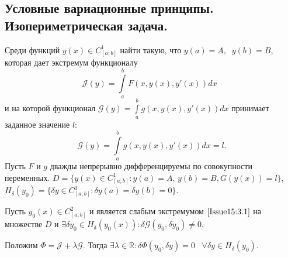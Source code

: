 \subsection{Условные вариационные принципы. Изопериметрическая задача.}
Среди функций $y(x)\in C^1_{[a;b]}$ найти такую, что $y(a)=A,\;\; y(b)=B$, которая дает экстремум функционалу 
\begin{equation}
	\mathcal{J}(y)=\int\limits_a^b F(x,y(x),y'(x))dx\;\;
	\label{Issue15:3.1}
\end{equation} 
и на которой функционал $\mathcal{G}(y) = \int\limits_a^b g(x,y(x),y'(x))dx$ принимает заданное значение $l$:
\begin{equation}
	\label{Issue15:3.2}
	\mathcal{G}(y)=\int\limits_a^b g(x,y(x),y'(x))d x=l.
\end{equation}
Пусть $F$ и $g$ дважды непрерывно дифференцируемы по совокупности переменных. $D=\{y(x)\in C^1_{[a;b]}:y(a)=A, \, y(b)=B, G(y(x))=l\}$, 
$H_\delta (y_0)=\{\delta y \in C^1_{[a;b]}:\delta y (a) = \delta  y(b)=0\}$.
\begin{theorem}
	Пусть $y_0(x)\in C^2_{[a;b]}$ и является слабым экстремумом $\eqref{Issue15:3.1}$ на множестве $D$ и $\exists \delta y_0\in H_\delta (y_0(x)): \delta \mathcal{G}(y_0,\delta y_0)\neq 0.$
	
	Положим $\Phi =\mathcal{J}+\lambda\mathcal{G}.$ Тогда $\exists \lambda \in \mathds{R}: \delta \Phi(y_0,\delta y)=0\;\;\;\forall \delta y\in H_\delta(y_0)$.
\end{theorem}
